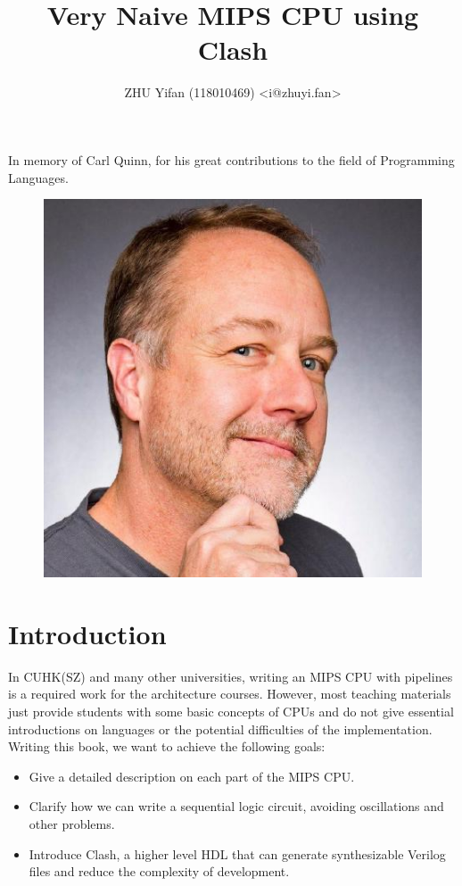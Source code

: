 \documentclass[a4paper,12pt, oneside]{book}
\title{Very Naive MIPS CPU using Clash}
\author{ZHU Yifan (118010469) <i@zhuyi.fan>}
\begin{document}
\frontmatter
\maketitle
\chapter*{}
\vspace*{\fill}
In memory of Carl Quinn, for his great contributions to the field of Programming Languages.
\begin{figure}[H]
	\centering
	\includegraphics[scale=0.8]{cquinn}
\end{figure}
\vspace*{\fill}
\chapter{Introduction}
In CUHK(SZ) and many other universities, writing an MIPS CPU with pipelines is a required work for the  architecture courses. However, most teaching materials just provide students with some basic concepts of CPUs and do not give essential introductions on languages or the potential difficulties of the implementation.
Writing this book, we want to achieve the following goals:
\begin{itemize}
	\item Give a detailed description on each part of the MIPS CPU.
	\item Clarify how we can write a sequential logic circuit, avoiding oscillations and other problems.  
	\item Introduce Clash, a higher level HDL that can generate synthesizable Verilog files and reduce the complexity of development. 
\end{itemize} 
\end{document}
